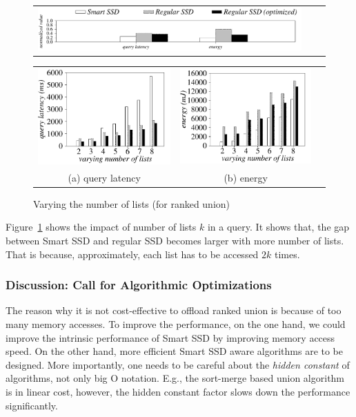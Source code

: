   \begin{figure}[H]
  \centering
    \begin{tabular}{ccc}
 \includegraphics[width=0.95\columnwidth]{figures/banner.pdf}
\end{tabular}
\renewcommand{\tabcolsep}{0.1mm}
  \begin{tabular}{ccc}
 \includegraphics[width=0.5\columnwidth]{figures/RankUnion-time-VaryNumLists-eps-converted-to.pdf}&
  \includegraphics[width=0.5\columnwidth]{figures/RankUnion-energy-VaryNumLists-eps-converted-to.pdf}\\
  (a) query latency & (b) energy
\end{tabular}
  \caption{Varying the number of lists (for ranked union)}
  \label{fig:varyNumKeywordsRankUnion}
 \end{figure}
Figure~\ref{fig:varyNumKeywordsRankUnion} shows the impact of number of lists $k$ in a query. It shows that, the gap between Smart SSD and regular SSD becomes larger with more number of lists. That is because, approximately, each list has to be accessed $2k$ times.



\subsubsection{Discussion: Call for Algorithmic Optimizations}\label{sec:rankUnionOpt}
The reason why it is not cost-effective to offload ranked union is because of too many memory accesses.
To improve the performance, on the one hand, we could improve the intrinsic performance of Smart SSD by improving memory access speed.
On the other hand, more efficient Smart SSD aware algorithms are to be designed. More importantly, one needs to be careful about the \emph{hidden constant} of algorithms, not only big O notation. E.g., the sort-merge based union algorithm is in linear cost, however, the hidden constant factor slows down the performance significantly.

